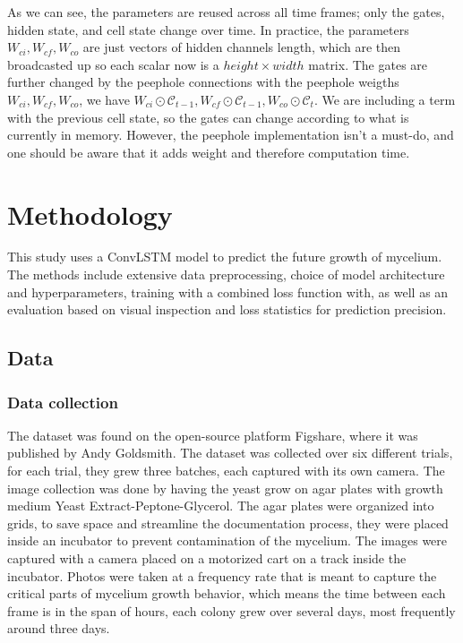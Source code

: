 \documentclass[a4paper,12pt]{article}
\begin{document}
As we can see, the parameters are reused across all time frames; only the gates, hidden state, and cell state change over time. In practice, the parameters $W_{ci}, W_{cf}, W_{co}$ are just vectors of hidden channels length, which are then broadcasted up so each scalar now is a $height \times width$ matrix.
The gates are further changed by the peephole connections with the peephole weigths $W_{ci}, W_{cf}, W_{co}$, we have $W_{ci} \odot \mathcal{C}_{t-1}, W_{cf} \odot \mathcal{C}_{t-1}, W_{co} \odot \mathcal{C}_t$. We are including a term with the previous cell state, so the gates can change according to what is currently in memory. However, the peephole implementation isn't a must-do, and one should be aware that it adds weight and therefore computation time.



\section{Methodology}
This study uses a ConvLSTM model to predict the future growth of mycelium. The methods include extensive data preprocessing, choice of model architecture and hyperparameters, training with a combined loss function with, as well as an evaluation based on visual inspection and loss statistics for prediction precision.

\subsection{Data}

\subsubsection{Data collection}
The dataset \cite{andyg} was found on the open-source platform Figshare, where it was published by Andy Goldsmith. The dataset was collected over six different trials, for each trial, they grew three batches, each captured with its own camera. The image collection was done by having the yeast grow on agar plates with growth medium Yeast Extract-Peptone-Glycerol. The agar plates were organized into grids, to save space and streamline the documentation process, they were placed inside an incubator to prevent contamination of the mycelium. The images were captured with a camera placed on a motorized cart on a track inside the incubator. Photos were taken at a frequency rate that is meant to capture the critical parts of mycelium growth behavior, which means the time between each frame is in the span of hours, each colony grew over several days, most frequently around three days.
\end{document}
